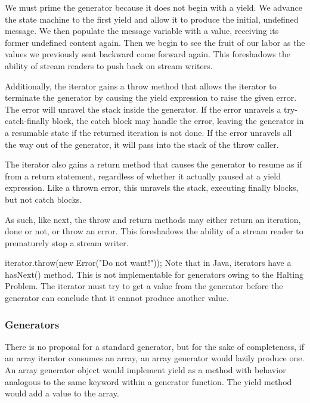 
We must prime the generator because it does not begin with a yield. We advance the state machine to the first yield and allow it to produce the initial, undefined message. We then populate the message variable with a value, receiving its former undefined content again. Then we begin to see the fruit of our labor as the values we previously sent backward come forward again. This foreshadows the ability of stream readers to push back on stream writers.

Additionally, the iterator gains a throw method that allows the iterator to terminate the generator by causing the yield expression to raise the given error. The error will unravel the stack inside the generator. If the error unravels a try-catch-finally block, the catch block may handle the error, leaving the generator in a resumable state if the returned iteration is not done. If the error unravels all the way out of the generator, it will pass into the stack of the throw caller.

The iterator also gains a return method that causes the generator to resume as if from a return statement, regardless of whether it actually paused at a yield expression. Like a thrown error, this unravels the stack, executing finally blocks, but not catch blocks.

As such, like next, the throw and return methods may either return an iteration, done or not, or throw an error. This foreshadows the ability of a stream reader to prematurely stop a stream writer.

iterator.throw(new Error("Do not want!"));
Note that in Java, iterators have a hasNext() method. This is not implementable for generators owing to the Halting Problem. The iterator must try to get a value from the generator before the generator can conclude that it cannot produce another value.

\subsubsection{Generators}

There is no proposal for a standard generator, but for the sake of completeness, if an array iterator consumes an array, an array generator would lazily produce one. An array generator object would implement yield as a method with behavior analogous to the same keyword within a generator function. The yield method would add a value to the array.

